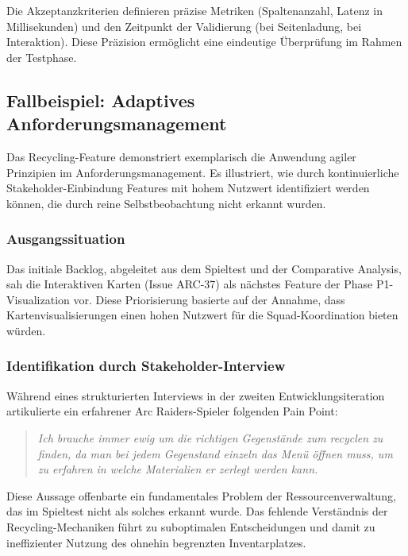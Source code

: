 Die Akzeptanzkriterien definieren präzise Metriken (Spaltenanzahl, Latenz in Millisekunden) und den Zeitpunkt der Validierung (bei Seitenladung, bei Interaktion). Diese Präzision ermöglicht eine eindeutige Überprüfung im Rahmen der Testphase.

\subsection{Fallbeispiel: Adaptives Anforderungsmanagement}
\label{sec:fallbeispiel-recycling}

Das Recycling-Feature demonstriert exemplarisch die Anwendung agiler Prinzipien im Anforderungsmanagement. Es illustriert, wie durch kontinuierliche Stakeholder-Einbindung Features mit hohem Nutzwert identifiziert werden können, die durch reine Selbstbeobachtung nicht erkannt wurden.

\subsubsection{Ausgangssituation}

Das initiale Backlog, abgeleitet aus dem Spieltest und der Comparative Analysis, sah die Interaktiven Karten (Issue ARC-37) als nächstes Feature der Phase P1-Visualization vor. Diese Priorisierung basierte auf der Annahme, dass Kartenvisualisierungen einen hohen Nutzwert für die Squad-Koordination bieten würden.

\subsubsection{Identifikation durch Stakeholder-Interview}

Während eines strukturierten Interviews in der zweiten Entwicklungsiteration artikulierte ein erfahrener Arc Raiders-Spieler folgenden Pain Point:

\begin{quote}
\textit{\glqq Ich brauche immer ewig um die richtigen Gegenstände zum recyclen zu finden, da man bei jedem Gegenstand einzeln das Menü öffnen muss, um zu erfahren in welche Materialien er zerlegt werden kann.\grqq{}}
\end{quote}

Diese Aussage offenbarte ein fundamentales Problem der Ressourcenverwaltung, das im Spieltest nicht als solches erkannt wurde. Das fehlende Verständnis der Recycling-Mechaniken führt zu suboptimalen Entscheidungen und damit zu ineffizienter Nutzung des ohnehin begrenzten Inventarplatzes.


